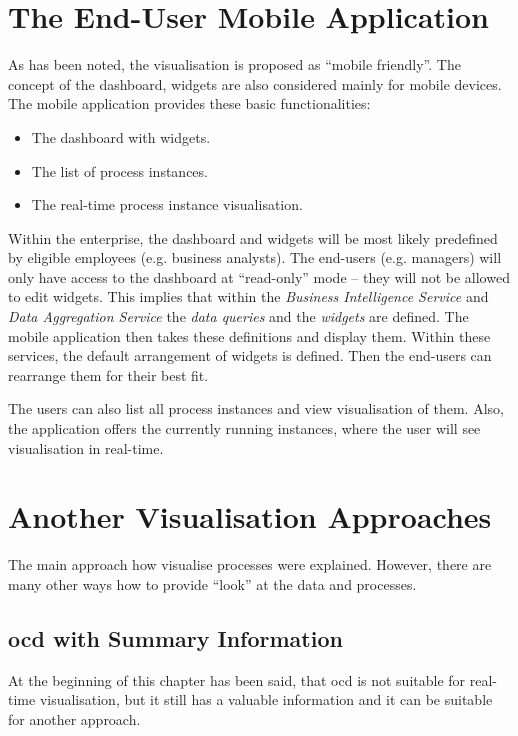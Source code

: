 \section{The End-User Mobile Application}
As has been noted, the visualisation is proposed as ``mobile friendly''. The concept of the dashboard, widgets are also considered mainly for mobile devices. The mobile application provides these basic functionalities:

\begin{itemize}
\item The dashboard with widgets.
\item The list of process instances.
\item The real-time process instance visualisation.
\end{itemize}

Within the enterprise, the dashboard and widgets will be most likely predefined by eligible employees (e.g. business analysts). The end-users (e.g. managers) will only have access to the dashboard at ``read-only'' mode -- they will not be allowed to edit widgets. This implies that within the \textit{Business Intelligence Service} and \textit{Data Aggregation Service} the \textit{data queries} and the \textit{widgets} are defined. The mobile application then takes these definitions and display them. Within these services, the default arrangement of widgets is defined. Then the end-users can rearrange them for their best fit. 

The users can also list all process instances and view visualisation of them. Also, the application offers the currently running instances, where the user will see visualisation in real-time. 
\section{Another Visualisation Approaches}
The main approach how visualise processes were explained. However, there are many other ways how to provide ``look'' at the data and processes. 
\subsection{\gls{ocd} with Summary Information}
At the beginning of this chapter has been said, that \gls{ocd} is not suitable for real-time visualisation, but it still has a valuable information and it can be suitable for another approach. 

